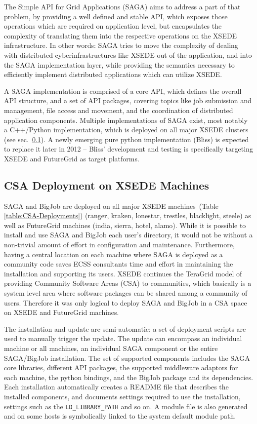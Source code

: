 \documentclass{sig-alternate}
\begin{document}
The Simple API for Grid Applications (SAGA) aims to address a part of
that problem, by providing a well defined and stable API, which
exposes those operations which are required on application level, but
encapsulates the complexity of translating them into the respective
operations on the XSEDE infrastructure.  In other words: SAGA tries
to move the complexity of dealing with distributed
cyberinfrastructures like XSEDE out of the application, and into the
SAGA implementation layer, while providing the semantics necessary to
efficiently implement distributed applications which can utilize
XSEDE.

A SAGA implementation is comprised of a
core API, which defines the overall API structure, and a set of API
packages, covering topics like job submission and management, file
access and movement, and the coordination of distributed application
components.  Multiple implementations of SAGA exist, most notably a
C++/Python implementation, which is deployed on all major XSEDE
clusters (see sec.~\ref{ssec:csa}).  A newly emerging pure python
implementation (Bliss) is expected to replace it later in 2012 --
Bliss' development and testing is specifically targeting XSEDE and
FutureGrid as target platforms.

\subsection{CSA Deployment on XSEDE Machines}
 \label{ssec:csa}
 
SAGA and BigJob are deployed on all major XSEDE
machines~(Table \ref{table:CSA-Deployments}) (ranger,
kraken, lonestar, trestles, blacklight, steele) as well as FutureGrid machines
(india, sierra, hotel, alamo). While it is possible to install and
use SAGA and BigJob each user's directory, it would not be without a non-trivial
amount of effort in configuration and maintenance. Furthermore, having a
central location on each machine where SAGA is deployed as a community code
saves ECSS consultants time and effort in maintaining the installation and
supporting its users. XSEDE continues the TeraGrid model of providing Community
Software Areas (CSA) to communities, which basically is a system
level area where software packages can be shared among a community of users.
Therefore it was only logical to deploy SAGA and BigJob in a CSA space on XSEDE
and FutureGrid machines.

The installation and update are semi-automatic: a set of deployment
scripts are used to manually trigger the update. The update can encompass an
individual machine or all machines, an individual SAGA component or the entire
SAGA/BigJob installation. The set of supported components includes the SAGA core
libraries, different API packages, the supported
middleware adaptors for each machine, the python bindings, and the
BigJob package and its dependencies. Each installation automatically creates a
README file that describes the installed components, and documents settings
required to use the installation, settings such as the
\texttt{LD\_LIBRARY\_PATH} and so on. A module file is also generated and on
some hosts is symbolically linked to the system default module path. 
\end{document}
